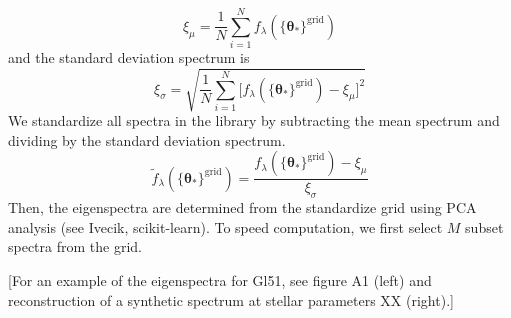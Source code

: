 \documentclass[iop,floatfix,twocolappendix]{emulateapj}
\newcommand{\vt}{ {\bm \theta}}
\begin{document}
\begin{equation}
  \xi_\mu = \frac{1}{N} \sum_{i = 1}^N f_\lambda(\{\vt_\ast \}^\textrm{grid})
\end{equation}
and the standard deviation spectrum is
\begin{equation}
  \xi_\sigma = \sqrt{\frac{1}{N} \sum_{i=1}^N \bigl [ f_\lambda(\{\vt_\ast \}^\textrm{grid}) - \xi_\mu \bigr]^2 } 
\end{equation}
We standardize all spectra in the library by subtracting the mean spectrum and dividing by the standard deviation spectrum.
\begin{equation}
  \widetilde{f}_\lambda(\{\vt_\ast \}^\textrm{grid}) = \frac{f_\lambda(\{\vt_\ast \}^\textrm{grid}) - \xi_\mu}{\xi_\sigma}
\end{equation}
Then, the eigenspectra are determined from the standardize grid using PCA analysis (see Ivecik, scikit-learn). To speed computation, we first select $M$ subset spectra from the grid. 


[For an example of the eigenspectra for Gl51, see figure A1 (left) and reconstruction of a synthetic spectrum at stellar parameters XX (right).]
\end{document}
